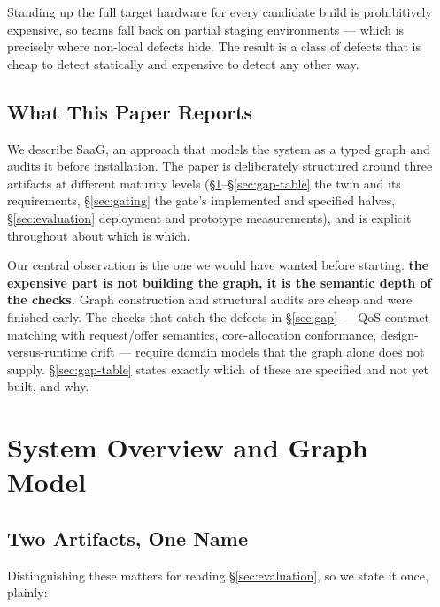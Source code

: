 \documentclass[sigconf,9pt]{acmart}
\begin{document}
Standing up the full target hardware for every candidate build is prohibitively expensive, so
teams fall back on partial staging environments --- which is precisely where non-local defects hide.
The result is a class of defects that is cheap to detect statically and expensive to detect any
other way.

\subsection{What This Paper Reports}
\label{sec:contrib}

We describe SaaG, an approach that models the system as a typed graph and audits it before
installation. The paper is deliberately structured around three artifacts at different maturity
levels (\S\ref{sec:overview}--\S\ref{sec:gap-table} the twin and its requirements,
\S\ref{sec:gating} the gate's implemented and specified halves, \S\ref{sec:evaluation} deployment
and prototype measurements), and is explicit throughout about which is which.

Our central observation is the one we would have wanted before starting: \textbf{the expensive
part is not building the graph, it is the semantic depth of the checks.} Graph construction and
structural audits are cheap and were finished early. The checks that catch the defects in
\S\ref{sec:gap} --- QoS contract matching with request/offer semantics, core-allocation conformance,
design-versus-runtime drift --- require domain models that the graph alone does not supply.
\S\ref{sec:gap-table} states exactly which of these are specified and not yet built, and why.

\section{System Overview and Graph Model}
\label{sec:overview}

\subsection{Two Artifacts, One Name}
\label{sec:twoartifacts}

Distinguishing these matters for reading \S\ref{sec:evaluation}, so we state it once, plainly:
\end{document}
